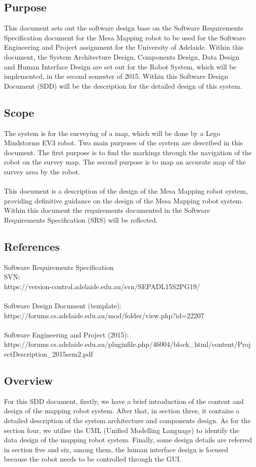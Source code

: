 \documentclass[11pt, a4paper]{article}
\begin{document}
\subsection{Purpose}
This document sets out the software design base on the Software Requirements Specification document for the Mesa Mapping robot to be used for the Software Engineering and Project assignment for the University of Adelaide. Within this document, the System Architecture Design, Components Design, Data Design and Human Interface Design are set out for the Robot System, which will be implemented, in the second semester of 2015. Within this Software Design Document (SDD) will be the description for the detailed design of this system.

\subsection{Scope}
The system is for the surveying of a map, which will be done by a Lego Mindstorms EV3 robot. Two main purposes of the system are described in this document. The first purpose is to find the markings through the navigation of the robot on the survey map. The second purpose is to map an accurate map of the survey area by the robot. \\
\\
This document is a description of the design of the Mesa Mapping robot system, providing definitive guidance on the design of the Mesa Mapping robot system. Within this document the requirements documented in the Software Requirements Specification (SRS) will be reflected. 

\subsection{References}
Software Requirements Specification\\
SVN: \\
https://version-control.adelaide.edu.au/svn/SEPADL15S2PG19/\\
\\
Software Design Document (template): \\
https://forums.cs.adelaide.edu.au/mod/folder/view.php?id=22207\\
\\
Software Engineering and Project (2015):\\
https://forums.cs.adelaide.edu.au/pluginfile.php/46004/block\_html/content/ProjectDescription\_2015sem2.pdf

\subsection{Overview}
For this SDD document, firstly, we have a brief introduction of the content and design of the mapping robot system. After that, in section three, it contains a detailed description of the system architecture and components design. As for the section four, we utilise the UML (Unified Modelling Language) to identify the data design of the mapping robot system. Finally, some design details are referred in section five and six, among them, the human interface design is focused because the robot needs to be controlled through the GUI.
\end{document}
